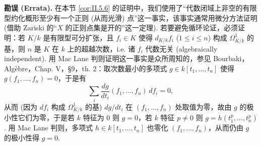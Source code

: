 \begin{remarkstar}
\textbf{勘误 (Errata).} 在本节 \ref{cor:II.5.6} 的证明中，我们使用了``代数闭域上非空的有限型约化概形至少有一个正则 (从而光滑) 点''这一事实，该事实通常用微分方法证明 (借助 Zariski 的``$X$ 的正则点集是开的''这一定理). 若要避免循环论证，必须证明：若 $K/k$ 是有限型可分扩张，且 $f_i \in K$ 使得 $d_{K/k} f_i$ ($1 \leqslant i \leqslant n$) 构成 $\varOmega_{K/k}^{1}$ 的基，则 $n$ 是 $K$ 在 $k$ 上的超越次数，i.e. 诸 $f_i$ 代数无关 (algebraically independent). 用 Mac Lane 判则证明这一事实是众所周知的，参见 Bourbaki，Algèbre，Chap. V，§9，th. 2：取次数最小的多项式 $g \in k[t_1, \dots, t_n]$ 使得 $g(f_1, \dots, f_n) = 0$，于是有
\[
\sum_i \frac{dg}{dt_i}(f_1, \dots, f_n)\, df_i = 0,
\]
从而 (因为 $df_i$ 构成 $\varOmega_{K/k}^{1}$ 的基) $dg/dt_i$ 在 $(f_1, \dots, f_n)$ 处取值为零，故由 $g$ 的极小性它们为零，于是若 $k$ 特征为 0 则 $g = 0$，若 $k$ 特征 $p \neq 0$ 则 $g = h(t_1^p, \dots, t_n^p)$. 用 Mac Lane 判则，多项式 $h \in k[t_1, \dots, t_n]$ 也零化 $(f_1, \dots, f_n)$，从而仍由 $g$ 的极小性得 $g = 0$.
\end{remarkstar}

